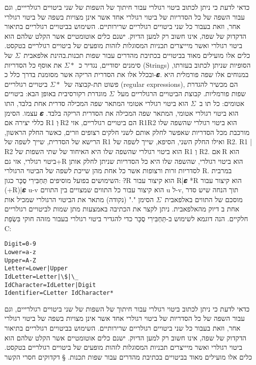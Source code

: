 {כדאי לדעת כי ניתן לכתוב ביטוי רגולרי עבור חיתוך של השפות של שני ביטויים
רגולרייים, וגם עבור השפה של כל הסדריות של ביטוי רגולרי אחד אשר אינן מצויות בשפה
של ביטוי רגולרי אחר, וזאת בעבור כל שני ביטויים רגולריים שרירותיים. השימוש
בביטויים רגולריים בתיאור הדקדוק של שפה, אינו חשוב רק למען הדיוק. ישנם כלים
אוטומטיים אשר הקלט שלהם הוא ביטוי רגולרי ואשר מיייצרים תכניות המסוגלות לזהות
מופעים של ביטויים רגולריים בטקסט. כלים אלו מועילים מאוד בביטויים בכתיבת מהדרים
עבור שפות תכנות.בהינת אלפאבית~$Σ$ של סימנים יסודיים, נגדיר כ~$Σ*$ את אוסף כל הסדריות (Strings) הסופיות שניתן לכתוב בעזרתו, ובכלל אלו את הסדרית הריקה אשר מסומנת בדרך כלל כ-𝜺. במנוחים אלו שפה פורמלית היא פשוט תת-קבוצה של~$Σ*$ ביטויים רגולריים (regular expressions), הם מכשיר להגדרת שפות פורמליות.
קבוצת הביטויים הרגולריים מעל~$Σ$ מוגדרת רקורסיבית באופן הבא:
ביטויים אטומים:
כל תו ב~$Σ$ הוא ביטוי רגולרי אטומי המתאר שפה המכילה סדרית אחת בלבד, התו עצמו.
הסימן 𝜺 הוא ביטוי רגולרי אטומי, המתאר שפה המכילה את הסדרית הריקה בלבד.
כללי יצירה
אם R1 וְ ּR2 הם ביטויים רגולריים, אזי
R1R2 הוא ביטוי רגולרי שהשפה שלו מורכבת מכל הסדריות שאפשר לחלק אותם לשני חלקים
רצופים וזרים, כאשר החלק הראשון, הרישא של הסדרית, שייך לשפה של R1 ואילו החלק
השני, הסיפא, שייך לשפה של R2. R1 | R2 הוא ביטוי רגולרי שהשפה שלו היא האיחוד של
שתי השפות של R1 וְ R2. אם ּR הוא ביטוי רגולרי, אזי גם+R הוא ביטוי רגולרי, שהשפה
שלו היא כל הסדריות שניתן לחלק אותן לסדריות זרות ורצופות אשר כל אחת מהן שייכת
לשפה של הביטוי הרגולרי R.
במרבית השימושים בפועל מוסיפים תַּחְבִּירִי סֻכָּר כגון:
?ּR הוא קיצור עבור R|𝜺 *R הוא קיצור עבור (+R)|𝜺
u-v הוא קיצור עבור כל התווים שמצויים בין התווים u ל-v, תוך הנחה שיש סדר מוסכם
של התווים באלפאבית~$Σ$ הסימן "." (נקודה) מתאר את הביטוי הרגולרי שמכיל אות אחת
ב
דיוק מהאלפאבית.
ניתן לקצר את הכתיבה באמצעות מתן שמות לביטויים רגולריים חלקיים.
הנה דוגמא לשימוש ב-תַּחְבִּירִי סֻכָּר כדי להגדיר ביטוי רגולרי בעבור מזהה חוקי בִּשְׂפַת C:
\begin{verbatim}
Digit=0-9
Lower=a-z
Upper=A-Z
Letter=Lower|Upper
IdLetter=Letter|\$|\_
IdCharacter=IdLetter|Digit
Identifier=CLetter IdCharacter*
\end{verbatim}

כדאי לדעת כי ניתן לכתוב ביטוי רגולרי עבור חיתוך של השפות של שני ביטויים
רגולרייים, וגם עבור השפה של כל הסדריות של ביטוי רגולרי אחד אשר אינן מצויות בשפה
של ביטוי רגולרי אחר, וזאת בעבור כל שני ביטויים רגולריים שרירותיים. השימוש
בביטויים רגולריים בתיאור הדקדוק של שפה, אינו חשוב רק למען הדיוק. ישנם כלים
אוטומטיים אשר הקלט שלהם הוא ביטוי רגולרי ואשר מיייצרים תכניות המסוגלות לזהות
מופעים של ביטויים רגולריים בטקסט. כלים אלו מועילים מאוד בביטויים בכתיבת מהדרים
עבור שפות תכנות.
§ דקדוקים חסרי הקשר

}
